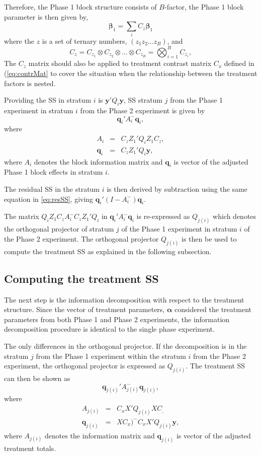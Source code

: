 \documentclass[article]{jss}
\begin{document}
Therefore, the Phase 1 block structure consists of $B$-factor, the Phase 1 block parameter is then given by, 
\begin{equation}
\bm{\beta}_1 = \sum_z{C_z\bm{\beta}_1}
\end{equation}
where the $z$ is a set of ternary numbers, $(z_1 z_2 \dots z_{B})$, and 
\[
C_z =  C_{z_1} \otimes  C_{z_2} \otimes \dots \otimes  C_{z_{B}} = \bigotimes^{B} _{i = 1} C_{z_i},
\]
The $C_{z}$ matrix should also be applied to treatment contrast matrix $C_{x}$ defined in (\ref{eq:contrMat} to cover the situation when the relationship between the treatment factors is nested. 

Providing the SS in stratum $i$ is $\bm{y}' Q_i\bm{y}$, SS stratum $j$ from the Phase 1 experiment in stratum $i$ from the Phase 2 experiment is given by 
\[
 \bm{q}_{i}' A_{i}^{-} \bm{q}_{i},
\]
where
\begin{eqnarray*}
A_i &=& C_z Z_1' Q_i  Z_1 C_z,\\
\bm{q}_i &=& C_z  Z_1' Q_i \bm{y},
\end{eqnarray*}
where $A_i$ denotes the block information matrix and $\bm{q}_i$ is vector of the adjusted Phase 1 block effects in stratum $i$.

The residual SS in the stratum $i$ is then derived by subtraction using the same equation in \ref{eq:resSS}, giving $\bm{q}_{i}'(I- A_{i}^{-}) \bm{q}_{i}$.

The matrix $Q_i Z_1 C_z A_{i}^{-}C_z  Z_1' Q_i$ in $\bm{q}_{i}' A_{i}^{-} \bm{q}_{i}$ is re-expressed as $Q_{j(i)}$ which denotes the orthogonal projector of stratum $j$ of the Phase 1 experiment in stratum $i$ of the Phase 2 experiment. The orthogonal projector $Q_{j(i)}$ is then be used to compute the treatment SS as explained in the following subsection.

\subsection{Computing the treatment SS}
\label{subsec:trtDecomp}
The next step is the information decomposition with respect to the treatment structure. Since the vector of treatment parameters, $\bm{\alpha}$ considered the treatment parameters from both Phase 1 and Phase 2 experiments, the information decomposition procedure is identical to the single phase experiment. 

The only differences in the orthogonal projector. If the decomposition is in the stratum $j$ from the Phase 1 experiment within the stratum $i$ from the Phase 2 experiment, the orthogonal projector is expressed as $Q_{j(i)}$. The treatment SS can then be shown as
\[
\bm{q}_{j(i)}' A_{j(i)}^{-} \bm{q}_{j(i)},
\]
where
\begin{eqnarray*}
A_{j(i)} &=& C_x X' Q_{j(i)} X C_,\\
\bm{q}_{j(i)} &=& X C_x)^{-} C_x X' Q_{j(i)} \bm{y},
\end{eqnarray*}
where $A_{j(i)} $ denotes the information matrix and $\bm{q}_{j(i)}$ is vector of the adjusted treatment totals.
\end{document}
